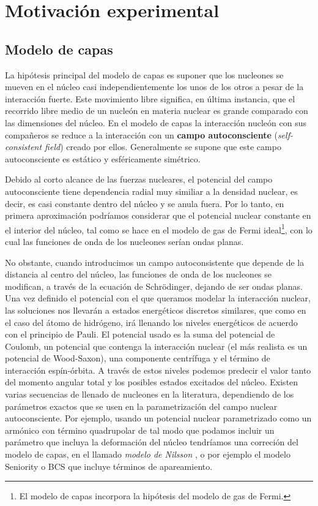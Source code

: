 \section{Motivación experimental}



\subsection{Modelo de capas}

La hipótesis principal del modelo de capas es suponer que los nucleones se mueven en el núcleo casi independientemente los unos de los otros a pesar de la interacción fuerte. Este movimiento libre significa, en última instancia, que el recorrido libre medio de un nucleón en materia nuclear es grande comparado con las dimensiones del núcleo. En el modelo de capas la interacción nucleón con sus compañeros se reduce a la interacción con un \textbf{campo autoconsciente} (\textit{self-consistent field}) creado por ellos. Generalmente se supone que este campo autoconsciente es estático y esféricamente simétrico.

Debido al corto alcance de las fuerzas nucleares, el potencial del campo autoconsciente tiene dependencia radial muy similiar a la densidad nuclear, es decir, es casi constante dentro del núcleo y se anula fuera. Por lo tanto, en primera aproximación podríamos considerar que el potencial nuclear constante en el interior del núcleo, tal como se hace en el modelo de gas de Fermi ideal\footnote{El modelo de capas incorpora la hipótesis del modelo de gas de Fermi.}, con lo cual las funciones de onda de los nucleones serían ondas planas.

No obstante, cuando introducimos un campo autoconsistente que depende de la distancia al centro del núcleo, las funciones de onda de los nucleones se modifican, a través de la ecuación de Schrödinger, dejando de ser ondas planas. Una vez definido el potencial con el que queramos modelar la interacción nuclear, las soluciones nos llevarán a estados energéticos discretos similares, que como en el caso del átomo de hidrógeno, irá llenando los niveles energéticos de acuerdo con el principio de Pauli. El potencial usado es la suma del potencial de Coulomb, un potencial que contenga la interacción nuclear (el más realista es un potencial de Wood-Saxon), una componente centrífuga y el término de interacción espín-órbita. A través de estos niveles podemos predecir el valor tanto del momento angular total y los posibles estados excitados del núcleo. Existen varias secuencias de llenado de nucleones en la literatura, dependiendo de los parámetros exactos que se usen en la parametrización del campo nuclear autoconsciente. Por ejemplo, usando un potencial nuclear parametrizado como un armónico con término quadrupolar de tal modo que podamos incluir un parámetro que incluya la deformación del núcleo tendríamos una correción del modelo de capas, en el llamado \textit{modelo de Nilsson} \cite{Nilsson:212345}, o por ejemplo el modelo Seniority o BCS \cite{Broglia} que incluye términos de apareamiento. 


